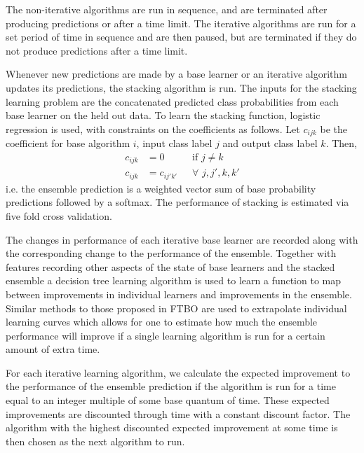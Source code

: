 \documentclass{article} %
\begin{document}
The non-iterative algorithms are run in sequence, and are terminated after producing predictions or after a time limit.
The iterative algorithms are run for a set period of time in sequence and are then paused, but are terminated if they do not produce predictions after a time limit.

Whenever new predictions are made by a base learner or an iterative algorithm updates its predictions, the stacking algorithm is run.
The inputs for the stacking learning problem are the concatenated predicted class probabilities from each base learner on the held out data.
To learn the stacking function, logistic regression is used, with constraints on the coefficients as follows.
Let $c_{ijk}$ be the coefficient for base algorithm $i$, input class label $j$ and output class label $k$.
Then,
\begin{align}
  c_{ijk} &= 0\phantom{c_{ij'k'}} \quad \textrm{if}\,\, j \neq k \\
  c_{ijk} &= c_{ij'k'}\phantom{0} \quad \forall\,\, j, j', k, k'
\end{align}
i.e. the ensemble prediction is a weighted vector sum of base probability predictions followed by a softmax.
The performance of stacking is estimated via five fold cross validation\footnotemark{}.


The changes in performance of each iterative base learner are recorded along with the corresponding change to the performance of the ensemble.
Together with features recording other aspects of the state of base learners and the stacked ensemble a decision tree learning algorithm is used to learn a function to map between improvements in individual learners and improvements in the ensemble.
Similar methods to those proposed in FTBO are used to extrapolate individual learning curves which allows for one to estimate how much the ensemble performance will improve if a single learning algorithm is run for a certain amount of extra time.

For each iterative learning algorithm, we calculate the expected improvement to the performance of the ensemble prediction if the algorithm is run for a time equal to an integer multiple of some base quantum of time.
These expected improvements are discounted through time with a constant discount factor.
The algorithm with the highest discounted expected improvement at some time is then chosen as the next algorithm to run.
\end{document}
